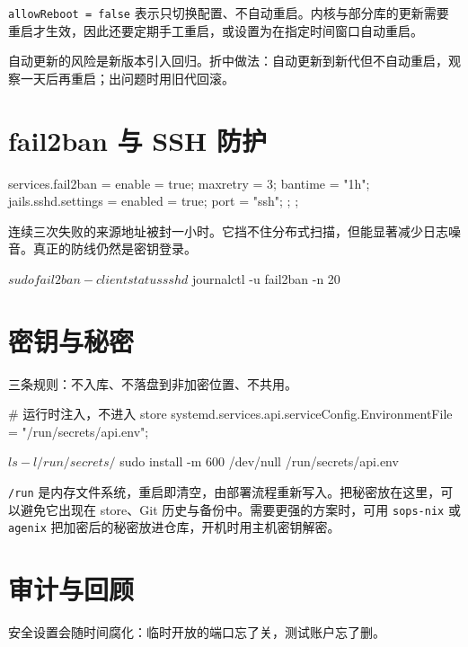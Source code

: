 \texttt{allowReboot = false} 表示只切换配置、不自动重启。内核与部分库的更新需要重启才生效，因此还要定期手工重启，或设置为在指定时间窗口自动重启。

自动更新的风险是新版本引入回归。折中做法：自动更新到新代但不自动重启，观察一天后再重启；出问题时用旧代回滚。

\section{fail2ban 与 SSH 防护}

\begin{nixcode}
services.fail2ban = {
  enable = true;
  maxretry = 3;
  bantime = "1h";
  jails.sshd.settings = {
    enabled = true;
    port = "ssh";
  };
};
\end{nixcode}

连续三次失败的来源地址被封一小时。它挡不住分布式扫描，但能显著减少日志噪音。真正的防线仍然是密钥登录。

\begin{shellsession}
$ sudo fail2ban-client status sshd
$ journalctl -u fail2ban -n 20
\end{shellsession}

\section{密钥与秘密}

三条规则：不入库、不落盘到非加密位置、不共用。

\begin{nixcode}
# 运行时注入，不进入 store
systemd.services.api.serviceConfig.EnvironmentFile = "/run/secrets/api.env";
\end{nixcode}

\begin{shellsession}
$ ls -l /run/secrets/
$ sudo install -m 600 /dev/null /run/secrets/api.env
\end{shellsession}

\texttt{/run} 是内存文件系统，重启即清空，由部署流程重新写入。把秘密放在这里，可以避免它出现在 store、Git 历史与备份中。需要更强的方案时，可用 \texttt{sops-nix} 或 \texttt{agenix} 把加密后的秘密放进仓库，开机时用主机密钥解密。

\section{审计与回顾}

安全设置会随时间腐化：临时开放的端口忘了关，测试账户忘了删。

